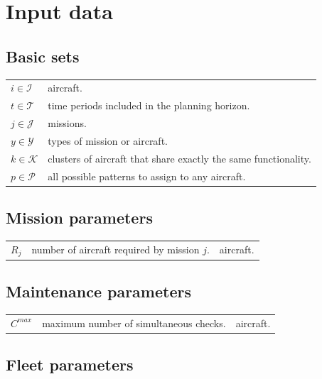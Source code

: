 \documentclass[a4paper,11pt]{article}
\begin{document}
\section{Input data}

    \subsection{Basic sets}

        \begin{tabular}{p{15mm}p{140mm}}
            $i \in \mathcal{I}$     &  aircraft. \\
            $t \in \mathcal{T}$     &  time periods included in the planning horizon. \\
            $j \in \mathcal{J}$     &  missions. \\
            $y \in \mathcal{Y}$     &  types of mission or aircraft. \\
            $k \in \mathcal{K}$     &  clusters of aircraft that share exactly the same functionality. \\
            $p \in \mathcal{P}$     &  all possible patterns to assign to any aircraft. \\
        \end{tabular}

    \subsection{Mission parameters}

        \begin{tabular}{p{15mm}p{125mm}p{15mm}}
            $R_j$             & number of aircraft required by mission $j$. & aircraft. \\
        \end{tabular}

    \subsection{Maintenance parameters}

        \begin{tabular}{p{15mm}p{125mm}p{15mm}}
            $C^{max}$         & maximum number of simultaneous checks. & aircraft. \\
        \end{tabular}

    \subsection{Fleet parameters}
\end{document}
